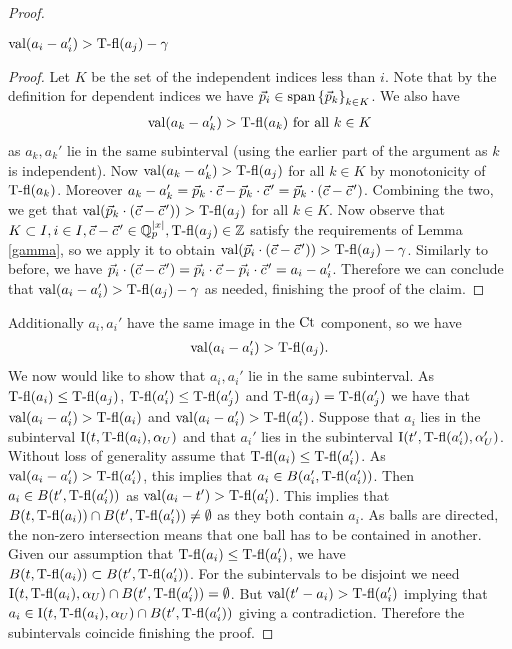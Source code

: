 \begin{proof}
  \begin{Claim}
    $\operatorname{val}(a_i - a_i') > \operatorname{T-fl}(a_j) - \gamma$
  \end{Claim}
  \begin{proof}
    Let $K$ be the set of the independent indices less than $i$.
    Note that by the definition for dependent indices we have $\vec p_i \in \operatorname{span} \left\{\vec p_k\right\}_{k \in K}$.
    We also have 
    \begin{align*}
      \operatorname{val}(a_k - a_k') > \operatorname{T-fl}(a_k) \text { for all } k \in K
    \end{align*}
    as $a_k, a_k'$ lie in the same subinterval (using the earlier part of the argument as $k$ is independent).
    Now $\operatorname{val}(a_k - a_k') > \operatorname{T-fl}(a_j)$  for all $k \in K$ by monotonicity of $\operatorname{T-fl}(a_k)$.
    Moreover $a_k - a_k' = \vec p_k \cdot \vec c - \vec p_k \cdot \pvec c' = \vec p_k \cdot (\vec c - \pvec {c}')$.
    Combining the two, we get that $\val(\vec p_k \cdot (\vec c - \pvec {c}')) > \tfl(a_j)$ for all $k \in K$.
    Now observe that $K \subset I, i \in I, \vec c - \pvec {c}' \in \Q_p^{|x|}, \tfl(a_j) \in \Z$
    satisfy the requirements of Lemma \ref {gamma}, so we apply it to obtain
    $\val(\vec p_i \cdot (\vec c - \pvec {c}')) > \tfl(a_j) - \gamma$.
    Similarly to before, we have $\vec p_i \cdot (\vec c - \pvec {c}') = \vec p_i \cdot \vec c - \vec p_i \cdot \pvec {c}' = a_i - a_i'$.
    Therefore we can conclude that $\operatorname{val}(a_i - a_i') > \operatorname{T-fl}(a_j) - \gamma$
    as needed, finishing the proof of the claim.
  \end{proof}	
  Additionally $a_i, a_i'$ have the same image in the $\operatorname{Ct}$ component, so we have
  \begin{align*}
    \operatorname{val}(a_i - a_i') > \operatorname{T-fl}(a_j).
  \end{align*}
  We now would like to show that $a_i, a_i'$ lie in the same subinterval.
  As $\operatorname{T-fl}(a_i) \leq \operatorname{T-fl}(a_j)$, $\operatorname{T-fl}(a_i') \leq \operatorname{T-fl}(a_j')$ and $\operatorname{T-fl}(a_j) = \operatorname{T-fl}(a_j')$ we have that
  $\operatorname{val}(a_i - a_i') > \operatorname{T-fl}(a_i)$ and $\operatorname{val}(a_i - a_i') > \operatorname{T-fl}(a_i')$.
  Suppose that $a_i$ lies in the subinterval $\operatorname{I}(t, \operatorname{T-fl}(a_i), \alpha_U)$
  and that $a_i'$ lies in the subinterval $\operatorname{I}(t', \operatorname{T-fl}(a_i'), \alpha_U')$.
  Without loss of generality assume that $\operatorname{T-fl}(a_i) \leq \operatorname{T-fl}(a_i')$.
  As $\operatorname{val}(a_i - a_i') > \operatorname{T-fl}(a_i')$, this implies that $a_i \in B(a_i', \operatorname{T-fl}(a_i'))$.
  Then $a_i \in B(t', \operatorname{T-fl}(a_i'))$ as $\operatorname{val}(a_i - t') > \operatorname{T-fl}(a_i')$.
  This implies that $B(t, \operatorname{T-fl}(a_i)) \cap B(t', \operatorname{T-fl}(a_i')) \neq \emptyset$ as they both contain $a_i$.
  As balls are directed, the non-zero intersection means that one ball has to be contained in another.
  Given our assumption that $\operatorname{T-fl}(a_i) \leq \operatorname{T-fl}(a_i')$, we have $B(t, \operatorname{T-fl}(a_i)) \subset B(t', \operatorname{T-fl}(a_i'))$.
  For the subintervals to be disjoint we need 
  $\operatorname{I}(t, \operatorname{T-fl}(a_i), \alpha_U) \cap B(t', \operatorname{T-fl}(a_i')) = \emptyset$.
  But $\operatorname{val}(t' - a_i) > \operatorname{T-fl}(a_i')$ implying that $a_i \in \operatorname{I}(t, \operatorname{T-fl}(a_i), \alpha_U) \cap B(t', \operatorname{T-fl}(a_i'))$ giving a contradiction.
  Therefore the subintervals coincide finishing the proof.
\end{proof}

